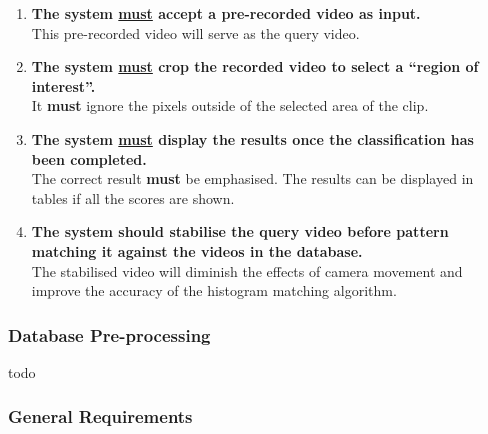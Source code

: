 \begin{enumerate}
    \item \textbf{The system \underline{must} accept a pre-recorded video as input.}\\
    This pre-recorded video will serve as the query video.
    
    \item \textbf{The system \underline{must} crop the recorded video to select a ``region of interest''.}\\
    It \textbf{must} ignore the pixels outside of the selected area of the clip.
    
    \item \textbf{The system \underline{must} display the results once the classification has been completed.}\\
    The correct result \textbf{must} be emphasised. The results can be displayed in tables if all the scores are shown.
    
    \item \textbf{The system \underline{}{should} stabilise the query video before pattern matching it against the videos in the database.}\\
    The stabilised video will diminish the effects of camera movement and improve the accuracy of the histogram matching algorithm.
    
    
   
\end{enumerate}

\subsubsection{Database Pre-processing}

todo

\subsubsection{General Requirements}

